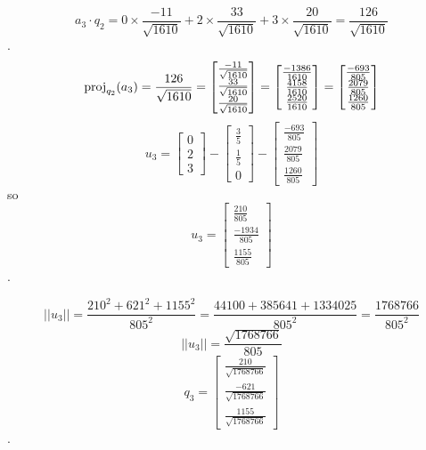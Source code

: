 \documentclass[12pt]{article}
\begin{document}
\begin{enumerate}[leftmargin=0em]
        \[a_3 \cdot q_2 = 0 \times \frac{-11}{\sqrt{1610}} + 2 \times \frac{33}{\sqrt{1610}} + 3 \times \frac{20}{\sqrt{1610}} = \frac{126}{\sqrt{1610}}\].
        \[\operatorname{proj}_{q_2}(a_3) = \frac{126}{\sqrt{1610}} = \begin{bmatrix}
            \frac{-11}{\sqrt{1610}} \\
            \frac{33}{\sqrt{1610}} \\
            \frac{20}{\sqrt{1610}}
        \end{bmatrix} = \begin{bmatrix}
            \frac{-1386}{1610} \\
            \frac{4158}{1610} \\
            \frac{2520}{1610}
        \end{bmatrix} = \begin{bmatrix}
            \frac{-693}{805} \\
            \frac{2079}{805} \\
            \frac{1260}{805}
        \end{bmatrix}\] 
        \[u_3 = \begin{bmatrix}
            0 \\
            2 \\
            3 
        \end{bmatrix} - \begin{bmatrix}
            \frac{3}{5} \\
            \frac{1}{5} \\
            0
        \end{bmatrix} - \begin{bmatrix}
            \frac{-693}{805} \\
            \frac{2079}{805} \\
            \frac{1260}{805}
        \end{bmatrix}\] so \[u_3 = 
        \begin{bmatrix}
            \frac{210}{805} \\
            \frac{-1934}{805} \\
            \frac{1155}{805}
        \end{bmatrix}\].

        \[||u_3|| = \frac{210^2+621^2+1155^2}{805^2} = \frac{44100 + 385641 + 1334025}{805^2} = \frac{1768766}{805^2}\]
        \[||u_3|| = \frac{\sqrt{1768766}}{805}\]
        \[q_3 = \begin{bmatrix}
            \frac{210}{\sqrt{1768766}} \\
            \frac{-621}{\sqrt{1768766}} \\
            \frac{1155}{\sqrt{1768766}}
        \end{bmatrix}\].


\end{enumerate}
\end{document}
